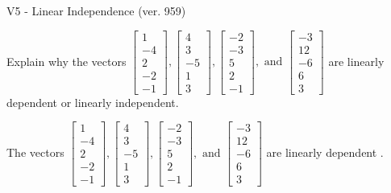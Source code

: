 \begin{exercise}
  \begin{exerciseTitle}V5 - Linear Independence (ver. 959)\end{exerciseTitle}
  \begin{exerciseStatement}
    Explain why the vectors \(\left[\begin{array}{r}
1 \\
-4 \\
2 \\
-2 \\
-1
\end{array}\right] , \left[\begin{array}{r}
4 \\
3 \\
-5 \\
1 \\
3
\end{array}\right] , \left[\begin{array}{r}
-2 \\
-3 \\
5 \\
2 \\
-1
\end{array}\right] , \text{ and } \left[\begin{array}{r}
-3 \\
12 \\
-6 \\
6 \\
3
\end{array}\right]\) are linearly dependent or linearly independent.	


  \end{exerciseStatement}
  \begin{exerciseAnswer}
   The vectors \(\left[\begin{array}{r}
1 \\
-4 \\
2 \\
-2 \\
-1
\end{array}\right] , \left[\begin{array}{r}
4 \\
3 \\
-5 \\
1 \\
3
\end{array}\right] , \left[\begin{array}{r}
-2 \\
-3 \\
5 \\
2 \\
-1
\end{array}\right] , \text{ and } \left[\begin{array}{r}
-3 \\
12 \\
-6 \\
6 \\
3
\end{array}\right]\) are 
  	 linearly dependent  .
  


  \end{exerciseAnswer}
\end{exercise}
